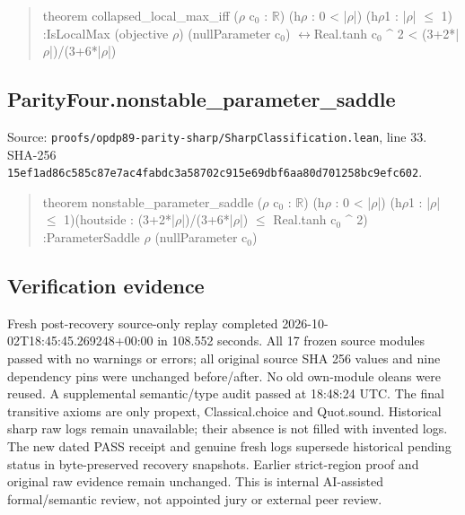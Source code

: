 \documentclass[11pt,a4paper]{article}
\begin{document}
\begin{quote}\small\ttfamily theorem collapsed\_local\_max\_iff (\ensuremath{\rho} c\ensuremath{_0} : \ensuremath{\mathbb{R}}) (h\ensuremath{\rho} : 0 < |\ensuremath{\rho}|) (h\ensuremath{\rho}1 : |\ensuremath{\rho}| \ensuremath{\leq} 1) :\newline IsLocalMax (objective \ensuremath{\rho}) (nullParameter c\ensuremath{_0}) \ensuremath{\leftrightarrow}\newline Real.tanh c\ensuremath{_0} \textasciicircum{} 2 < (3+2*|\ensuremath{\rho}|)/(3+6*|\ensuremath{\rho}|)\end{quote}
\subsection{ParityFour.nonstable\_parameter\_saddle}
Source: \texttt{proofs/opdp89-parity-sharp/SharpClassification.lean}, line 33. SHA-256 \texttt{15ef1ad86c585c87e7ac4fabdc3a58702c915e69dbf6aa80d701258bc9efc602}.

\begin{quote}\small\ttfamily theorem nonstable\_parameter\_saddle (\ensuremath{\rho} c\ensuremath{_0} : \ensuremath{\mathbb{R}}) (h\ensuremath{\rho} : 0 < |\ensuremath{\rho}|) (h\ensuremath{\rho}1 : |\ensuremath{\rho}| \ensuremath{\leq} 1)\newline (houtside : (3+2*|\ensuremath{\rho}|)/(3+6*|\ensuremath{\rho}|) \ensuremath{\leq} Real.tanh c\ensuremath{_0} \textasciicircum{} 2) :\newline ParameterSaddle \ensuremath{\rho} (nullParameter c\ensuremath{_0})\end{quote}
\subsection{Verification evidence}
Fresh post-recovery source-only replay completed 2026-10-02T18:45:45.269248+00:00 in 108.552 seconds. All 17 frozen source modules passed with no warnings or errors; all original source SHA 256 values and nine dependency pins were unchanged before/after. No old own-module oleans were reused. A supplemental semantic/type audit passed at 18:48:24 UTC. The final transitive axioms are only propext, Classical.choice and Quot.sound. Historical sharp raw logs remain unavailable; their absence is not filled with invented logs. The new dated PASS receipt and genuine fresh logs supersede historical pending status in byte-preserved recovery snapshots. Earlier strict-region proof and original raw evidence remain unchanged. This is internal AI-assisted formal/semantic review, not appointed jury or external peer review.
\end{document}
